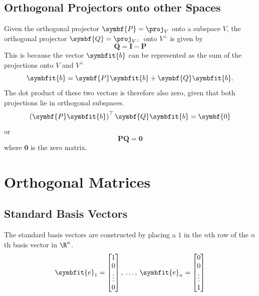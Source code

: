 \documentclass{article}
\begin{document}
\subsection{Orthogonal Projectors onto other Spaces}
Given the orthogonal projector \(\symbf{P} = \proj_V\) onto a subspace \(V\), the
orthogonal projector \(\symbf{Q} = \proj_{V^\perp}\) onto \(V^\perp\) is given by
\begin{equation*}
    \symbf{Q} = \symbf{I} - \symbf{P}
\end{equation*}
This is because the vector \(\symbfit{b}\) can be represented as the
sum of the projections onto \(V\) and \(V^\perp\)
\begin{equation*}
    \symbfit{b} = \symbf{P}\symbfit{b} + \symbf{Q}\symbfit{b}.
\end{equation*}
The dot product of these two vectors is therefore also zero, given that
both projections lie in orthogonal subspaces.
\begin{equation*}
    \left( \symbf{P}\symbfit{b} \right)^\top \symbf{Q}\symbfit{b} = \symbf{0}
\end{equation*}
or
\begin{equation*}
    \symbf{P} \symbf{Q} = \symbf{0}
\end{equation*}
where \(\symbf{0}\) is the zero matrix.
\section{Orthogonal Matrices}
\subsection{Standard Basis Vectors}
The standard basis vectors are constructed by placing a \(1\)
in the \(n\)th row of the \(n\)th basis vector in \(\R^n\).
\begin{equation*}
    \symbfit{e}_1 =
    \begin{bmatrix}
        1      \\
        0      \\
        \vdots \\
        0
    \end{bmatrix}
    ,\: \dots,\: \symbfit{e}_n =
    \begin{bmatrix}
        0      \\
        0      \\
        \vdots \\
        1
    \end{bmatrix}
\end{equation*}
\end{document}
